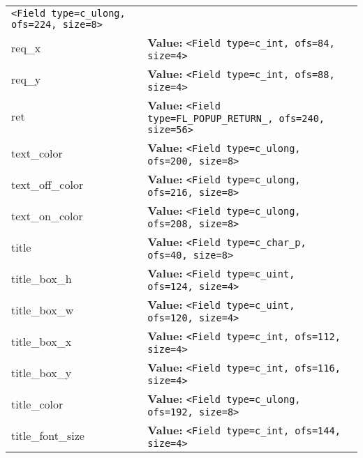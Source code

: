 \begin{longtable}{|p{\varnamewidth}|p{\vardescrwidth}|l}
{\tt {\textless}Field type=c\_ulong, ofs=224, size=8{\textgreater}}&\\
\cline{1-2}
\raggedright r\-e\-q\-\_\-x\- & \raggedright \textbf{Value:} 
{\tt {\textless}Field type=c\_int, ofs=84, size=4{\textgreater}}&\\
\cline{1-2}
\raggedright r\-e\-q\-\_\-y\- & \raggedright \textbf{Value:} 
{\tt {\textless}Field type=c\_int, ofs=88, size=4{\textgreater}}&\\
\cline{1-2}
\raggedright r\-e\-t\- & \raggedright \textbf{Value:} 
{\tt {\textless}Field type=FL\_POPUP\_RETURN\_, ofs=240, size=56{\textgreater}}&\\
\cline{1-2}
\raggedright t\-e\-x\-t\-\_\-c\-o\-l\-o\-r\- & \raggedright \textbf{Value:} 
{\tt {\textless}Field type=c\_ulong, ofs=200, size=8{\textgreater}}&\\
\cline{1-2}
\raggedright t\-e\-x\-t\-\_\-o\-f\-f\-\_\-c\-o\-l\-o\-r\- & \raggedright \textbf{Value:} 
{\tt {\textless}Field type=c\_ulong, ofs=216, size=8{\textgreater}}&\\
\cline{1-2}
\raggedright t\-e\-x\-t\-\_\-o\-n\-\_\-c\-o\-l\-o\-r\- & \raggedright \textbf{Value:} 
{\tt {\textless}Field type=c\_ulong, ofs=208, size=8{\textgreater}}&\\
\cline{1-2}
\raggedright t\-i\-t\-l\-e\- & \raggedright \textbf{Value:} 
{\tt {\textless}Field type=c\_char\_p, ofs=40, size=8{\textgreater}}&\\
\cline{1-2}
\raggedright t\-i\-t\-l\-e\-\_\-b\-o\-x\-\_\-h\- & \raggedright \textbf{Value:} 
{\tt {\textless}Field type=c\_uint, ofs=124, size=4{\textgreater}}&\\
\cline{1-2}
\raggedright t\-i\-t\-l\-e\-\_\-b\-o\-x\-\_\-w\- & \raggedright \textbf{Value:} 
{\tt {\textless}Field type=c\_uint, ofs=120, size=4{\textgreater}}&\\
\cline{1-2}
\raggedright t\-i\-t\-l\-e\-\_\-b\-o\-x\-\_\-x\- & \raggedright \textbf{Value:} 
{\tt {\textless}Field type=c\_int, ofs=112, size=4{\textgreater}}&\\
\cline{1-2}
\raggedright t\-i\-t\-l\-e\-\_\-b\-o\-x\-\_\-y\- & \raggedright \textbf{Value:} 
{\tt {\textless}Field type=c\_int, ofs=116, size=4{\textgreater}}&\\
\cline{1-2}
\raggedright t\-i\-t\-l\-e\-\_\-c\-o\-l\-o\-r\- & \raggedright \textbf{Value:} 
{\tt {\textless}Field type=c\_ulong, ofs=192, size=8{\textgreater}}&\\
\cline{1-2}
\raggedright t\-i\-t\-l\-e\-\_\-f\-o\-n\-t\-\_\-s\-i\-z\-e\- & \raggedright \textbf{Value:} 
{\tt {\textless}Field type=c\_int, ofs=144, size=4{\textgreater}}&\\

\end{longtable}
